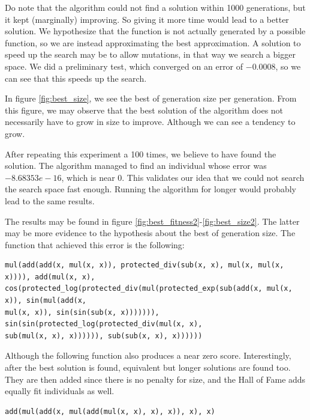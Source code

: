 \documentclass[11pt]{article}
\begin{document}
Do note that the algorithm could not find a solution within 1000 generations, but it kept (marginally) improving. So giving it more time would lead to a better solution. We hypothesize that the function is not actually generated by a possible function, so we are instead approximating the best approximation. A solution to speed up the search may be to allow mutations, in that way we search a bigger space. We did a preliminary test, which converged on an error of $-0.0008$, so we can see that this speeds up the search.

In figure \ref{fig:best_size}, we see the best of generation size per generation. From this figure, we may observe that the best solution of the algorithm does not necessarily have to grow in size to improve. Although we can see a tendency to grow.

After repeating this experiment a 100 times, we believe to have found the solution. The algorithm managed to find an individual whose error was $-8.68353e-16$, which is near $0$. This validates our idea that we could not search the search space fast enough. Running the algorithm for longer would probably lead to the same results.

The results may be found in figure \ref{fig:best_fitness2}-\ref{fig:best_size2}. The latter may be more evidence to the hypothesis about the best of generation size. The function that achieved this error is the following:


\begin{verbatim}
mul(add(add(x, mul(x, x)), protected_div(sub(x, x), mul(x, mul(x, x)))), add(mul(x, x),
cos(protected_log(protected_div(mul(protected_exp(sub(add(x, mul(x, x)), sin(mul(add(x, 
mul(x, x)), sin(sin(sub(x, x))))))), sin(sin(protected_log(protected_div(mul(x, x), 
sub(mul(x, x), x)))))), sub(sub(x, x), x))))))
\end{verbatim}

Although the following function also produces a near zero score. Interestingly, after the best solution is found, equivalent but longer solutions are found too. They are then added since there is no penalty for size, and the Hall of Fame adds equally fit individuals as well. 

\begin{verbatim}
add(mul(add(x, mul(add(mul(x, x), x), x)), x), x)
\end{verbatim}
\end{document}
